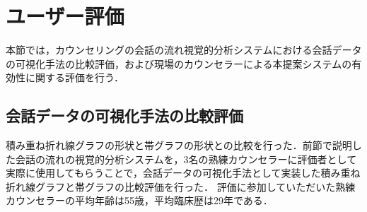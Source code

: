 \documentclass[shuuron]{kuee}
\begin{document}



%
%



\section{ユーザー評価}%



本節では，カウンセリングの会話の流れ視覚的分析システムにおける会話データの可視化手法の比較評価，および現場のカウンセラーによる本提案システムの有効性に関する評価を行う．%
%
%
%
%
%
%








\subsection{会話データの可視化手法の比較評価}
積み重ね折れ線グラフの形状と帯グラフの形状との比較を行った．前節で説明した会話の流れの視覚的分析システムを，3名の熟練カウンセラーに評価者として実際に使用してもらうことで，会話データの可視化手法として実装した積み重ね折れ線グラフと帯グラフの比較評価を行った．
評価に参加していただいた熟練カウンセラーの平均年齢は55歳，平均臨床歴は29年である．
\end{document}
